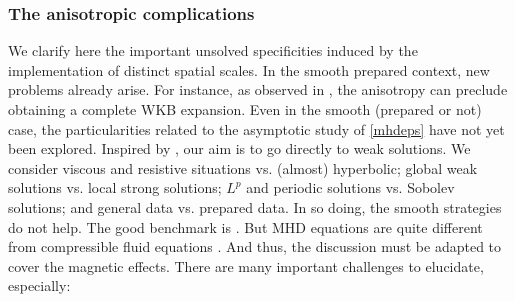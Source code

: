 \documentclass[11pt,reqno]{amsart}
\begin{document}
\subsubsection{The anisotropic complications}\label{sss:complications}
We clarify here the important unsolved specificities induced by the implementation of distinct spatial scales. In the smooth prepared context, new problems already arise. For instance, as observed in \cite{BC2}, the anisotropy can  preclude obtaining a complete WKB expansion. Even in the smooth (prepared or not) case, the particularities related to the asymptotic study of \eqref{mhdeps} have not yet been explored. Inspired by \cite{LM98}, our aim is to go directly to weak solutions. We consider viscous and resistive situations vs. (almost) hyperbolic; global weak solutions vs. local strong solutions; $ L^p $ and periodic solutions vs. Sobolev solutions; and general data vs. prepared data. In so doing, the smooth strategies do not help. The good benchmark is \cite{LM98}. But MHD equations are quite different from compressible fluid equations \cite{LM98}. And thus, the discussion  must be adapted to cover the magnetic effects. There are many important challenges to elucidate, especially:
\end{document}
